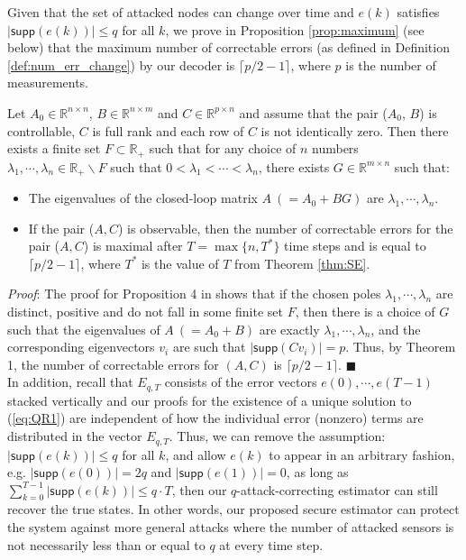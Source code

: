 \documentclass[../../thesis.tex]{subfiles}
\begin{document}
Given that the set of attacked nodes can change over time and $e(k)$ satisfies $\lvert \textsf{supp} (e(k)) \rvert \le q$ for all $k$, we prove in Proposition \ref{prop:maximum} (see below) that the maximum number of correctable errors (as defined in Definition \ref{def:num_err_change}) by our decoder is $\lceil p/2-1 \rceil$, where $p$ is the number of measurements. 

\begin{proposition}\label{prop:maximum} 
Let $A_0 \in \mathbb{R}^{n \times n}$, $B \in \mathbb{R}^{n \times m}$ and $C \in \mathbb{R}^{p \times n}$ and assume that the pair ($A_0$, $B$) is controllable, $C$ is full rank and each row of $C$ is not identically zero. Then there exists a finite set $F \subset \mathbb{R}_+$ such that for any choice of $n$ numbers $\lambda_1, \cdots, \lambda_n \in \mathbb{R}_+ \backslash F$ such that $0<\lambda_1< \cdots < \lambda_n$, there exists $G \in \mathbb{R}^{m \times n}$ such that:
\begin{itemize}
\item
The eigenvalues of the closed-loop matrix $A~(= A_0+BG)$ are $\lambda_1, \cdots, \lambda_n$.
\item
If the pair ($A, C$) is observable, then the number of correctable errors for the pair ($A, C$) is maximal after $T= \max\{n, T^*\}$ time steps and is equal to $\lceil p/2-1 \rceil$, where $T^*$ is the value of $T$ from Theorem \ref{thm:SE}. 
\end{itemize}
\end{proposition}

\textit{Proof}:
The proof for Proposition 4 in \cite{Fawzi:2014} shows that if the chosen poles $\lambda_1, \cdots, \lambda_n$ are distinct, positive and do not fall in some finite set $F$, then there is a choice of $G$ such that the eigenvalues of $A~(=A_0+B)$ are exactly $\lambda_1, \cdots, \lambda_n$, and the corresponding eigenvectors $v_i$ are such that $\lvert \textsf{supp} (C v_i) \rvert = p$. Thus, by Theorem 1, the number of correctable errors for $(A,C)$ is $\lceil p/2-1 \rceil$.
\hfill$\blacksquare$\\

In addition, recall that $E_{q,T}$ consists of the error vectors $e(0), \cdots, e(T-1)$ stacked vertically and our proofs for the existence of a unique solution to (\ref{eq:QR1}) are independent of how the individual error (nonzero) terms are distributed in the vector $E_{q,T}$. Thus, we can remove the assumption: $\lvert \textsf{supp} (e(k)) \rvert \le q$ for all $k$, and allow $e(k)$ to appear in an arbitrary fashion, e.g. $\lvert \textsf{supp} (e(0)) \rvert = 2q$ and $\lvert \textsf{supp} (e(1)) \rvert = 0$, as long as $\sum_{k=0}^{T-1} \lvert \textsf{supp} (e(k)) \rvert \leq q\cdot T$, then our $q$-attack-correcting estimator can still recover the true states. In other words, our proposed secure estimator can protect the system against more general attacks where the number of attacked sensors is not necessarily less than or equal to $q$ at every time step.
\end{document}
